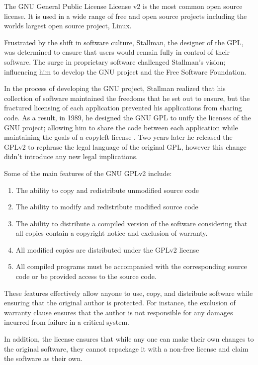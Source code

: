 \documentclass[12pt,letterpaper]{article}
\begin{document}
The GNU General Public License License v2 is the most common open source license. It is used in a wide range of free and open source projects including the worlds largest open source project, Linux.

Frustrated by the shift in software culture, Stallman, the designer of the GPL, was determined to ensure that users would remain fully in control of their software. The surge in proprietary software challenged Stallman's vision; influencing him to develop the GNU project and the Free Software Foundation.

In the process of developing the GNU project, Stallman realized that his collection of software maintained the freedoms that he set out to ensure, but the fractured licensing of each application prevented his applications from sharing code. As a result, in 1989, he designed the GNU GPL to unify the licenses of the GNU project; allowing him to share the code between each application while maintaining the goals of a copyleft license \cite{gpl2}. Two years later he released the GPLv2 to rephrase the legal language of the original GPL, however this change didn't introduce any new legal implications.

Some of the main features of the GNU GPLv2 include:
\begin{enumerate}
\item The ability to copy and redistribute unmodified source code
\item The ability to modify and redistribute modified source code
\item The ability to distribute a compiled version of the software considering that all copies contain a copyright notice and exclusion of warranty.
\item All modified copies are distributed under the GPLv2 license
\item All compiled programs must be accompanied with the corresponding source code or be provided access to the source code.
\end{enumerate}

\cite{gpl2}

These features effectively allow anyone to use, copy, and distribute software while ensuring that the original author is protected. For instance, the exclusion of warranty clause ensures that the author is not responsible for any damages incurred from failure in a critical system.

In addition, the license ensures that while any one can make their own changes to the original software, they cannot repackage it with a non-free license and claim the software as their own.
\end{document}

